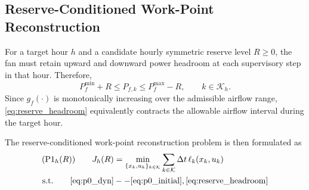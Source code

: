 \documentclass[journal]{IEEEtran}
\theoremstyle{remark}
\begin{document}


\subsection{Reserve-Conditioned Work-Point Reconstruction}
\label{subsec:work_point_reconstruction}

For a target hour \(h\) and a candidate hourly symmetric reserve level
\(R\ge0\), the fan must retain upward and downward power headroom at
each supervisory step in that hour. Therefore,
\begin{equation}
	P_f^{\min}+R
	\le
	P_{f,k}
	\le
	P_f^{\max}-R,
	\qquad
	k\in\mathcal{K}_h .
	\label{eq:reserve_headroom}
\end{equation}
Since \(g_f(\cdot)\) is monotonically increasing over the admissible
airflow range, \eqref{eq:reserve_headroom} equivalently contracts the
allowable airflow interval during the target hour.

The reserve-conditioned work-point reconstruction problem is then
formulated as
\begin{subequations}
	\label{prob:P1}
	\begin{align}
		(\mathrm{P1}_h(R))\qquad
		J_h(R)
		&=
		\min_{\{x_k,u_k\}_{k\in\mathcal{K}}}
		\sum_{k\in\mathcal{K}}
		\Delta t\,\ell_k(x_k,u_k)
		\label{eq:p1_obj}\\
		\mathrm{s.t.}\qquad
		\eqref{eq:p0_dyn}&--\eqref{eq:p0_initial},\eqref{eq:reserve_headroom}
	\end{align}
\end{subequations}
\end{document}

